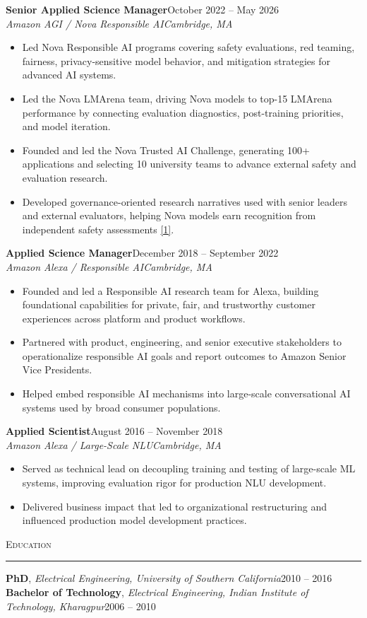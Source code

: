 \documentclass[11pt]{article}
\newcommand{\sectionheading}[1]{%
  \vspace{8pt}%
  {\large\scshape #1}\par\vspace{1pt}\hrule\vspace{3pt}%
}
\newcommand{\resumeentry}[5]{%
  \textbf{#1}\hfill #2\\
  \textit{#3}\hfill \textit{#4}
  \begin{itemize}
    #5
  \end{itemize}
  \vspace{2pt}
}
\begin{document}
\resumeentry
  {Senior Applied Science Manager}
  {October 2022 -- May 2026}
  {Amazon AGI / Nova Responsible AI}
  {Cambridge, MA}
  {\item Led Nova Responsible AI programs covering safety evaluations, red teaming, fairness, privacy-sensitive model behavior, and mitigation strategies for advanced AI systems.
   \item Led the Nova LMArena team, driving Nova models to top-15 LMArena performance by connecting evaluation diagnostics, post-training priorities, and model iteration.
   \item Founded and led the Nova Trusted AI Challenge, generating 100+ applications and selecting 10 university teams to advance external safety and evaluation research.
   \item Developed governance-oriented research narratives used with senior leaders and external evaluators, helping Nova models earn recognition from independent safety assessments \href{https://www.amazon.science/blog/independent-evaluations-demonstrate-nova-premiers-safety}{[1]}.}

\resumeentry
  {Applied Science Manager}
  {December 2018 -- September 2022}
  {Amazon Alexa / Responsible AI}
  {Cambridge, MA}
  {\item Founded and led a Responsible AI research team for Alexa, building foundational capabilities for private, fair, and trustworthy customer experiences across platform and product workflows.
   \item Partnered with product, engineering, and senior executive stakeholders to operationalize responsible AI goals and report outcomes to Amazon Senior Vice Presidents.
   \item Helped embed responsible AI mechanisms into large-scale conversational AI systems used by broad consumer populations.}

\resumeentry
  {Applied Scientist}
  {August 2016 -- November 2018}
  {Amazon Alexa / Large-Scale NLU}
  {Cambridge, MA}
  {\item Served as technical lead on decoupling training and testing of large-scale ML systems, improving evaluation rigor for production NLU development.
   \item Delivered business impact that led to organizational restructuring and influenced production model development practices.}

\sectionheading{Education}

\textbf{PhD}, \textit{Electrical Engineering, University of Southern California}\hfill 2010 -- 2016\\
\textbf{Bachelor of Technology}, \textit{Electrical Engineering, Indian Institute of Technology, Kharagpur}\hfill 2006 -- 2010
\end{document}
